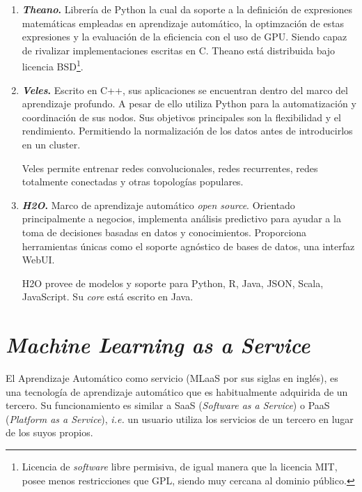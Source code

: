 \begin{enumerate}
\item \textbf{\textit{Theano}.}
Librería de Python la cual da soporte a la definición  de expresiones matemáticas empleadas en aprendizaje automático, la optimzación de estas expresiones y la evaluación de la eficiencia con el uso de GPU. Siendo capaz de rivalizar implementaciones escritas en C. Theano está distribuida bajo licencia BSD\footnote{Licencia de \textit{software} libre permisiva, de igual manera que la licencia MIT, posee menos restricciones que GPL, siendo muy cercana al dominio público.}.

\item \textbf{\textit{Veles}.}
Escrito en C++, sus aplicaciones se encuentran dentro del marco del aprendizaje profundo. A pesar de ello utiliza Python para la automatización y coordinación de sus nodos. Sus objetivos principales son la flexibilidad y el rendimiento. Permitiendo la normalización de los datos antes de introducirlos en un cluster.

Veles permite entrenar redes convolucionales, redes recurrentes, redes totalmente conectadas y otras topologías populares.

\item \textbf{\textit{H2O}.}
Marco de aprendizaje automático \textit{open source}. Orientado principalmente a negocios, implementa análisis predictivo para ayudar a la toma de decisiones basadas en datos y conocimientos. Proporciona herramientas únicas como el soporte agnóstico de bases de datos, una interfaz WebUI. 

H2O provee de modelos y soporte para Python, R, Java, JSON, Scala, JavaScript. Su \textit{core} está escrito en Java.

\end{enumerate}

\section{\textit{Machine Learning as a Service}}\label{related:MLaaS}
El Aprendizaje Automático como servicio (MLaaS por sus siglas en inglés), es una tecnología de aprendizaje automático que es habitualmente adquirida de un tercero. Su funcionamiento es similar a SaaS (\textit{Software as a Service}) o PaaS (\textit{Platform as a Service}), \textit{i.e.} un usuario utiliza los servicios de un tercero en lugar de los suyos propios.

